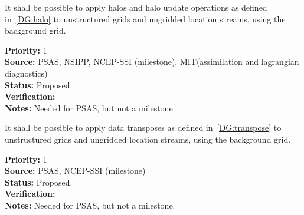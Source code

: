 
It shall be possible to apply halos and halo update operations as
defined in~\ref{DG:halo} to unstructured grids and ungridded location
streams, using the background grid.

\begin{reqlist}
{\bf Priority:} 1 \\ 
{\bf Source:} PSAS, NSIPP, NCEP-SSI (milestone), MIT(assimilation and lagrangian diagnostics) \\
{\bf Status:} Proposed. \\
{\bf Verification:} \\
{\bf Notes:} Needed for PSAS, but not a milestone.
\end{reqlist}


It shall be possible to apply data transposes as defined
in~\ref{DG:transpose} to unstructured grids and ungridded location
streams, using the background grid.

\begin{reqlist}
{\bf Priority:} 1 \\ 
{\bf Source:} PSAS, NCEP-SSI (milestone) \\
{\bf Status:} Proposed. \\
{\bf Verification:} \\
{\bf Notes:} Needed for PSAS, but not a milestone.
\end{reqlist}


